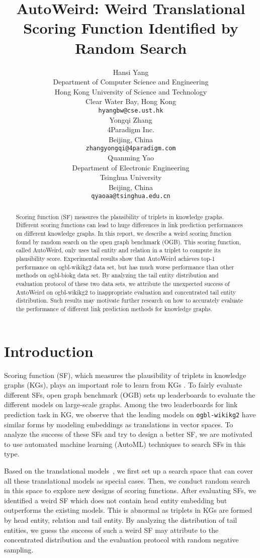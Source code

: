 \documentclass{article}
\title{AutoWeird:
	Weird Translational Scoring Function
	Identified by Random Search}
\author{Hansi Yang \\
  Department of Computer Science and Engineering \\
  Hong Kong University of Science and Technology \\
  Clear Water Bay, Hong Kong \\
  \texttt{hyangbw@cse.ust.hk} \\
\And
   Yongqi Zhang \\
   4Paradigm Inc. \\
   Beijing, China \\
   \texttt{zhangyongqi@4paradigm.com} \\
   \And
   Quanming Yao \\
   Department of Electronic Engineering \\
   Tsinghua University \\
   Beijing, China \\
   \texttt{qyaoaa@tsinghua.edu.cn} \\
}
\begin{document}
\maketitle


\begin{abstract}
Scoring function (SF) measures the plausibility of triplets in knowledge graphs. 
Different scoring functions can lead to huge differences in link prediction performances on different knowledge graphs. 
In this report, we describe a weird scoring function 
found by random search on the open graph benchmark (OGB).
This scoring function, called AutoWeird, only uses tail entity and relation in a triplet to compute its plausibility score. 
Experimental results show that AutoWeird achieves top-1 performance on ogbl-wikikg2 data set, 
but has much worse performance than other methods on ogbl-biokg data set. 
By analyzing the tail entity distribution and evaluation protocol of these two data sets, 
we attribute the unexpected success of AutoWeird on ogbl-wikikg2 to inappropriate evaluation and concentrated tail entity distribution. 
Such results may motivate further research on how to accurately evaluate the performance of different link prediction methods for knowledge graphs. 
\end{abstract}

\section{Introduction}



Scoring function (SF),
which measures the plausibility of triplets 
in knowledge graphs (KGs), 
plays an important role to learn from KGs \cite{wang2017knowledge,ji2021survey}.
To fairly evaluate different SFs,
open graph benchmark (OGB) \cite{hu2020ogb} sets up leaderboards 
to evaluate the different models on large-scale graphs.
Among the two leaderboards for link prediction task in KG,
we observe that the leading models on \texttt{ogbl-wikikg2} 
have similar forms by modeling embeddings as translations in vector spaces.
To analyze the success of these SFs
and try to design a better SF,
we are motivated to use automated machine learning (AutoML) techniques \cite{yao2018automl,zhang2020autosf,zhang2022bilinear}
to search SFs in this type.

Based on the translational models~\cite{bordes2013translating, wang2022interht, long2021triplere, chao2020pairre, zhang2022trans},
we first set up a search space that can cover all these translational models as special cases.
Then,
we conduct random search in this space to explore new designs of scoring functions.
After evaluating  SFs, 
we identified a weird SF which does not contain head entity embedding
but outperforms the existing models.
This is abnormal as triplets in KGs are formed by head entity, relation and tail entity.
By analyzing the distribution of tail entities,
we guess the success of such a weird SF may attribute to the
concentrated distribution and the evaluation protocol
with random negative sampling.
\end{document}
